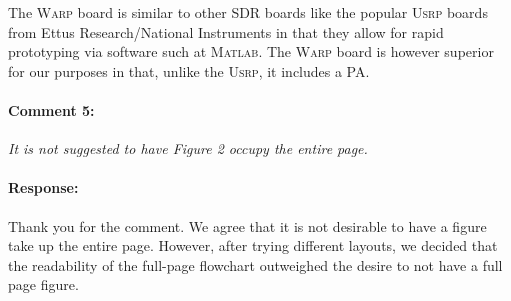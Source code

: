 \documentclass[]{article}
\begin{document}
{\color{red} The \textsc{Warp} board is similar to other SDR boards like the popular \textsc{Usrp} boards from Ettus Research/National Instruments in that they allow for rapid prototyping via software such at \textsc{Matlab}. The \textsc{Warp} board is however superior for our purposes in that, unlike the \textsc{Usrp}, it includes a PA.}

\paragraph{Comment 5:}\textit{It is not suggested to have Figure 2 occupy the entire page.}
\paragraph{Response:}
Thank you for the comment. We agree that it is not desirable to have a figure take up the entire page. However, after trying different layouts, we decided that the readability of the full-page flowchart outweighed the desire to not have a full page figure. 
\end{document}
